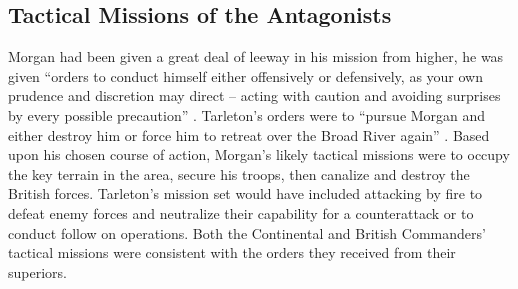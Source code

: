\subsection{Tactical Missions of the Antagonists}

Morgan had been given a great deal of leeway in his mission from higher, he was
given ``orders to conduct himself either offensively or defensively, as your
own prudence and discretion may direct -- acting with caution and avoiding
surprises by every possible precaution'' \cite[27]{weigley_partisan_1970}.
Tarleton's orders were to ``pursue Morgan and either destroy him or force him
to retreat over the Broad River again'' \cite[30]{fleming_cowpens_1988}. Based
upon his chosen course of action, Morgan's likely tactical missions were to
occupy the key terrain in the area, secure his troops, then canalize and
destroy the British forces.  Tarleton's mission set would have included
attacking by fire to defeat enemy forces and neutralize their capability for a
counterattack or to conduct follow on operations.  Both the Continental and
British Commanders' tactical missions were consistent with the orders they
received from their superiors.
